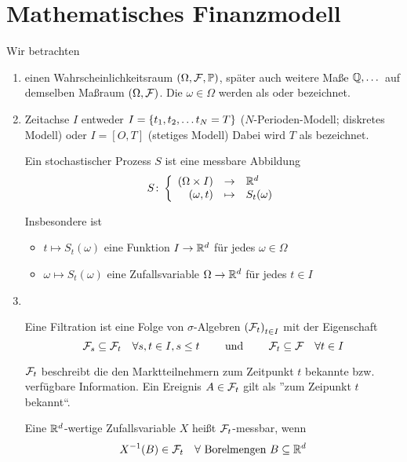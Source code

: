 \section{Mathematisches Finanzmodell}

Wir betrachten
\begin{enumerate}[leftmargin=*]
	\item einen Wahrscheinlichkeitsraum $(\Omega, \mathcal{F}, \mathbb{P})$, später auch weitere Maße $\mathbb{Q}, \dots$ auf demselben Maßraum $(\Omega, \mathcal{F})$. Die $\omega \in \Omega$ werden als  oder  bezeichnet.
	\item Zeitachse $I$ entweder $I = \left\{ t_1, t_2, \dots t_N = T \right\}$ ($N$-Perioden-Modell; diskretes Modell) oder $I = [O,T]$ (stetiges Modell)
	Dabei wird $T$ als  bezeichnet.
	\begin{definition}
		Ein stochastischer Prozess $S$ ist eine messbare Abbildung 
		\begin{equation*}
		S \colon \left\lbrace \begin{array}{rcl} (\Omega \times I) & \to & \mathbb{R}^d \\(\omega, t) & \mapsto & S_t(\omega) \end{array} \right.
		\end{equation*}
	\end{definition}
	Insbesondere ist 
	\begin{itemize}[nolistsep, topsep=-\parskip]
		\item $t \mapsto S_t(\omega)$ eine Funktion $I \to \mathbb{R}^d$ für jedes $\omega \in \Omega$ 
		\item $\omega \mapsto S_t(\omega)$ eine Zufallsvariable $\Omega \to \mathbb{R}^d$ für jedes $t \in I$
	\end{itemize}
	\item ~\vspace{-2em}
	 \begin{definition}[Filtration]
	 	Eine Filtration ist eine Folge von $\sigma$-Algebren $\left( \mathcal{F}_t \right)_{t \in I}$ mit der Eigenschaft
	 	\begin{equation*}
	 	\mathcal{F}_s \subseteq \mathcal{F}_t \quad \forall s,t \in I, s \le t \qquad \text{ und } \qquad \mathcal{F}_t \subseteq \mathcal{F} \quad \forall t \in I
	 	\end{equation*}
	 \end{definition}
 	\begin{*interpretation}
 		$\mathcal{F}_t$ beschreibt die den Marktteilnehmern zum Zeitpunkt $t$ bekannte bzw. verfügbare Information. Ein Ereignis $A \in \mathcal{F}_t$ gilt als ''zum Zeipunkt $t$ bekannt``.
 	\end{*interpretation}
	
	\begin{*erinnerung_inline}
		Eine $\mathbb{R}^d$-wertige Zufallsvariable $X$ heißt $\mathcal{F}_t$-messbar, wenn
		\begin{equation*}
		X^{-1}(B) \in \mathcal{F}_t \quad \forall \text{ Borelmengen } B \subseteq \mathbb{R}^d
		\end{equation*}
	\end{*erinnerung_inline}


\end{enumerate}
